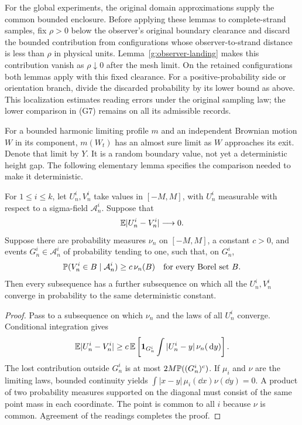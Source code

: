 For the global experiments, the original domain approximations supply
the common bounded enclosure. Before applying these lemmas to
complete-strand samples, fix $\rho>0$ below the observer's original
boundary clearance and discard the bounded contribution from
configurations whose observer-to-strand distance is less than $\rho$
in physical units. Lemma~\ref{g:observer-landing} makes this contribution
vanish as $\rho\downarrow0$ after the mesh limit. On the retained
configurations both lemmas apply with this fixed clearance. For a
positive-probability side or orientation branch, divide the discarded
probability by its lower bound as above. This localization estimates
reading errors under the original sampling law; the lower comparison
in (G7) remains on all its admissible records.

For a bounded harmonic limiting profile $m$ and an independent Brownian
motion $W$ in its component, $m(W_t)$ has an almost sure limit as $W$
approaches its exit. Denote that limit by $Y$. It is a random boundary
value, not yet a deterministic height gap. The following elementary lemma
specifies the comparison needed to make it deterministic.

\begin{lemma}
\label{h:common-kernel}
For $1\le i\le k$, let $U^i_n,V^i_n$ take values in $[-M,M]$, with
$U^i_n$ measurable with respect to a sigma-field $\mathcal A^i_n$.
Suppose that
\[
 \mathbb E|U^i_n-V^i_n|\longrightarrow0.
\]
Suppose there are probability measures $\nu_n$ on $[-M,M]$, a constant
$c>0$, and events $G^i_n\in\mathcal A^i_n$ of probability tending to one,
such that, on $G^i_n$,
\[
 \mathbb P(V^i_n\in B\mid\mathcal A^i_n)\ge c\,\nu_n(B)
 \quad\text{for every Borel set }B.
\]
Then every subsequence has a further subsequence on which all the
$U^i_n,V^i_n$ converge in probability to the same deterministic constant.
\end{lemma}
\begin{proof}
Pass to a subsequence on which $\nu_n$ and the laws of all $U^i_n$ converge.
Conditional integration gives
\[
 \mathbb E|U^i_n-V^i_n|
 \ge c\,\mathbb E\left[\mathbf1_{G^i_n}
          \int|U^i_n-y|\,\nu_n(\,\mathrm d y)\right].
\]
The lost contribution outside $G^i_n$ is at most $2M\mathbb P((G^i_n)^c)$.
If $\mu_i$ and $\nu$ are the limiting laws, bounded continuity yields
$\int|x-y|\,\mu_i(\dd x)\nu(\dd y)=0$.
A product of two probability measures supported on the diagonal must
consist of the same point mass in each coordinate. The point is common
to all $i$ because $\nu$ is common. Agreement of the readings completes
the proof.
\end{proof}

